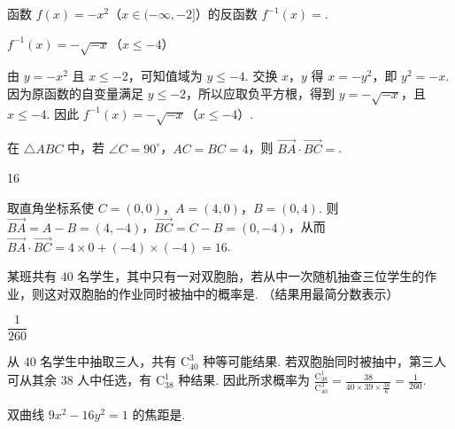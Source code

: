 \begin{problem}
函数 \( f(x) = -x^{2} \)（\(x \in (-\infty, -2]\)）的反函数 \( f^{-1}(x) = \)\fillinblank{}.
\end{problem}

\begin{answer}
\(f^{-1}(x)=-\sqrt{-x}\)（\(x\leqslant-4\)）
\end{answer}

\begin{solution}
由 \(y=-x^{2}\) 且 \(x\leqslant-2\)，可知值域为 \(y\leqslant-4\). 交换 \(x\)，\(y\) 得 \(x=-y^{2}\)，即 \(y^{2}=-x\). 因为原函数的自变量满足 \(y\leqslant-2\)，所以应取负平方根，得到 \(y=-\sqrt{-x}\)，且 \(x\leqslant-4\). 因此 \(f^{-1}(x)=-\sqrt{-x}\)（\(x\leqslant-4\)）.
\end{solution}

\begin{problem}
在 \(\triangle ABC\) 中，若 \(\angle C = 90^{\circ}\)，\(AC = BC = 4\)，则 \(\overrightarrow{BA} \cdot \overrightarrow{BC} =\)\fillinblank{}.
\end{problem}

\begin{answer}
16
\end{answer}

\begin{solution}
取直角坐标系使 \(C=(0,0)\)，\(A=(4,0)\)，\(B=(0,4)\). 则
\(\overrightarrow{BA}=A-B=(4,-4)\)，\(\overrightarrow{BC}=C-B=(0,-4)\)，从而
\(\overrightarrow{BA}\cdot\overrightarrow{BC}=4\times0+(-4)\times(-4)=16\).
\end{solution}

\begin{problem}
某班共有 \(40\) 名学生，其中只有一对双胞胎，若从中一次随机抽查三位学生的作业，则这对双胞胎的作业同时被抽中的概率是\fillinblank{}. （结果用最简分数表示）
\end{problem}

\begin{answer}
\(\dfrac{1}{260}\)
\end{answer}

\begin{solution}
从 \(40\) 名学生中抽取三人，共有 \(\mathrm C_{40}^{3}\) 种等可能结果. 若双胞胎同时被抽中，第三人可从其余 \(38\) 人中任选，有 \(\mathrm C_{38}^{1}\) 种结果. 因此所求概率为 \(\displaystyle\frac{\mathrm C_{38}^{1}}{\mathrm C_{40}^{3}}=\frac{38}{40\times39\times\frac{38}{6}}=\frac{1}{260}\).
\end{solution}

\begin{problem}
双曲线 \( 9x^{2}-16y^{2}=1 \) 的焦距是\fillinblank{}.
\end{problem}

